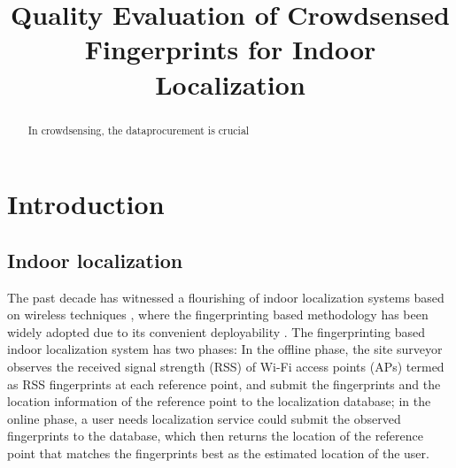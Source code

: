 \documentclass[10pt,conference,compsocconf,letterpaper]{IEEEtran}
\begin{document}
\title{Quality Evaluation of Crowdsensed Fingerprints for Indoor Localization}

%
%

\maketitle



\begin{abstract}
In crowdsensing, the dataprocurement is crucial
\end{abstract}


\section{Introduction}\label{sectionintro}

\subsection{Indoor localization}
The past decade has witnessed a flourishing of indoor localization systems based on wireless techniques \cite{ rsscsi}, where the fingerprinting based methodology has been widely adopted due to its convenient deployability \cite{ mobicom04, horus }. The fingerprinting based indoor localization system has two phases: In the offline phase, the site surveyor observes the received signal strength (RSS) of Wi-Fi access points (APs) termed as RSS fingerprints at each reference point, and submit the fingerprints and the location information of the reference point to the localization database; in the online phase, a user needs localization service could submit the observed fingerprints to the database, which then returns the location of the reference point that matches the fingerprints best as the estimated location of the user.   
\end{document}
